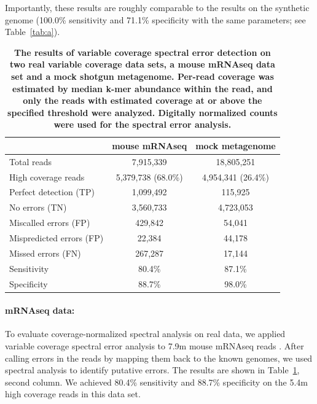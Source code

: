 \documentclass{article}
\begin{document}
Importantly, these results are roughly comparable to the results on the
synthetic genome (100.0\% sensitivity and 71.1\% specificity with the
same parameters; see Table~\ref{tab:a}).


\begin{table}
\begin{tabular}{|l|c||c|}
\hline
& {\bf mouse mRNAseq} & {\bf mock metagenome} \\
\hline
Total reads                & 7,915,339          & 18,805,251       \\
High coverage reads        & 5,379,738 (68.0\%) & 4,954,341 (26.4\%) \\
\hline
Perfect detection (TP)     & 1,099,492          & 115,925          \\
No errors (TN)             & 3,560,733          & 4,723,053         \\
Miscalled errors (FP)      & 429,842            & 54,041           \\
Mispredicted errors (FP)   & 22,384             & 44,178          \\
Missed errors (FN)         & 267,287            & 17,144            \\
\hline
Sensitivity                & 80.4\%             & 87.1\%          \\
Specificity                & 88.7\%             & 98.0\%          \\
\hline
\end{tabular}

\caption{{\bf The results of variable coverage spectral error
    detection on two real variable coverage data sets, a mouse mRNAseq
    data set and a mock shotgun metagenome.  Per-read coverage was
    estimated by median k-mer abundance within the read, and only the
    reads with estimated coverage at or above the specified threshold
    were analyzed.  Digitally normalized counts were used for the
    spectral error analysis.}}
\label{tab:spectra_variable_real}

\end{table}

\paragraph{mRNAseq data:}


To evaluate coverage-normalized spectral analysis on real data, we
applied variable coverage spectral error analysis to 7.9m mouse mRNAseq
reads \cite{Haas2013}.  After calling errors in the reads by mapping
them back to the known genomes, we used spectral analysis to identify
putative errors.  The results are shown in
Table~\ref{tab:spectra_variable_real}, second column.  We achieved
80.4\% sensitivity and 88.7\% specificity on the 5.4m high coverage
reads in this data set.
\end{document}
